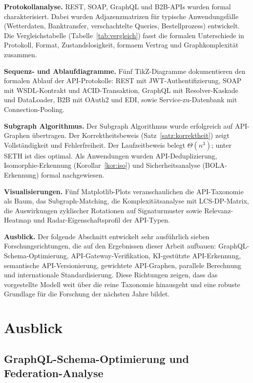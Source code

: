 ﻿\documentclass[a4paper,12pt]{article}
\theoremstyle{definition}
\begin{document}
\textbf{Protokollanalyse.} REST, SOAP, GraphQL und B2B-APIs wurden formal
charakterisiert. Dabei wurden Adjazenzmatrizen für typische Anwendungsfälle
(Wetterdaten, Banktransfer, verschachtelte Queries, Bestellprozess) entwickelt.
Die Vergleichstabelle (Tabelle~\ref{tab:vergleich}) fasst die formalen Unterschiede
in Protokoll, Format, Zustandslosigkeit, formaem Vertrag und Graphkomplexität zusammen.

\textbf{Sequenz- und Ablaufdiagramme.} Fünf TikZ-Diagramme dokumentieren den
formalen Ablauf der API-Protokolle: REST mit JWT-Authentifizierung, SOAP mit
WSDL-Kontrakt und ACID-Transaktion, GraphQL mit Resolver-Kaskade und DataLoader,
B2B mit OAuth2 und EDI, sowie Service-zu-Datenbank mit Connection-Pooling.

\textbf{Subgraph Algorithmus.} Der Subgraph Algorithmus wurde erfolgreich auf
API-Graphen übertragen. Der Korrektheitsbeweis (Satz~\ref{satz:korrektheit})
zeigt Vollständigkeit und Fehlerfreiheit. Der Laufzeitbeweis belegt $\Theta(n^3)$;
unter SETH ist dies optimal. Als Anwendungen wurden API-Deduplizierung,
Isomorphie-Erkennung (Korollar~\ref{kor:iso}) und Sicherheitsanalyse (BOLA-Erkennung)
formal nachgewiesen.

\textbf{Visualisierungen.} Fünf Matplotlib-Plots veranschaulichen die API-Taxonomie
als Baum, das Subgraph-Matching, die Komplexitätsanalyse mit LCS-DP-Matrix, die
Auswirkungen zyklischer Rotationen auf Signaturmuster sowie Relevanz-Heatmap und
Radar-Eigenschaftsprofil der API-Typen.

\textbf{Ausblick.} Der folgende Abschnitt entwickelt sehr ausführlich sieben
Forschungsrichtungen, die auf den Ergebnissen dieser Arbeit aufbauen: GraphQL-Schema-Optimierung,
API-Gateway-Verifikation, KI-gestützte API-Erkennung, semantische API-Versionierung,
gewichtete API-Graphen, parallele Berechnung und internationale Standardisierung.
Diese Richtungen zeigen, dass das vorgestellte Modell weit über die reine Taxonomie
hinausgeht und eine robuste Grundlage für die Forschung der nächsten Jahre bildet.

\section{Ausblick}

\subsection{GraphQL-Schema-Optimierung und Federation-Analyse}
\end{document}
